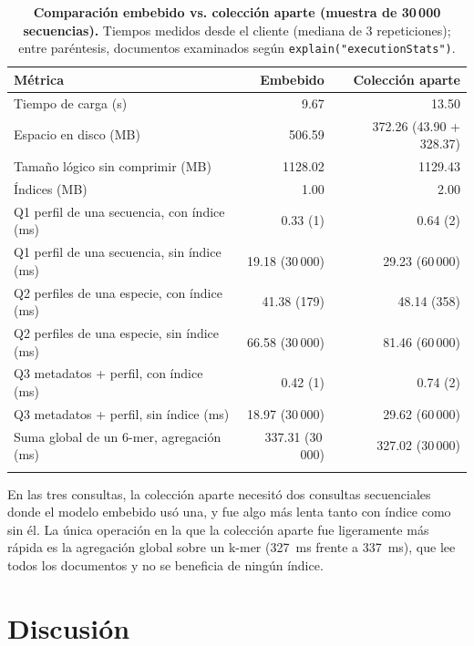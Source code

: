 \documentclass[pdflatex,sn-vancouver-num,lineno,referee]{sn-jnl}
\begin{document}
\begin{table}[!ht]
\caption{\textbf{Comparación embebido vs. colección aparte (muestra de 30\,000 secuencias).}
Tiempos medidos desde el cliente (mediana de 3 repeticiones); entre
paréntesis, documentos examinados según \texttt{explain("executionStats")}.}
\begin{tabular}{@{}lrr@{}}
\toprule
Métrica & Embebido & Colección aparte \\
\midrule
Tiempo de carga (s) & 9.67 & 13.50 \\
Espacio en disco (MB) & 506.59 & 372.26 (43.90 + 328.37) \\
Tamaño lógico sin comprimir (MB) & 1128.02 & 1129.43 \\
Índices (MB) & 1.00 & 2.00 \\
\midrule
Q1 perfil de una secuencia, con índice (ms) & 0.33 (1) & 0.64 (2) \\
Q1 perfil de una secuencia, sin índice (ms) & 19.18 (30\,000) & 29.23 (60\,000) \\
Q2 perfiles de una especie, con índice (ms) & 41.38 (179) & 48.14 (358) \\
Q2 perfiles de una especie, sin índice (ms) & 66.58 (30\,000) & 81.46 (60\,000) \\
Q3 metadatos + perfil, con índice (ms) & 0.42 (1) & 0.74 (2) \\
Q3 metadatos + perfil, sin índice (ms) & 18.97 (30\,000) & 29.62 (60\,000) \\
\midrule
Suma global de un 6-mer, agregación (ms) & 337.31 (30\,000) & 327.02 (30\,000) \\
\botrule
\end{tabular}
\label{tab:benchmark}
\end{table}

En las tres consultas, la colección aparte necesitó dos consultas
secuenciales donde el modelo embebido usó una, y fue algo más lenta tanto con
índice como sin él. La única operación en la que la colección aparte fue
ligeramente más rápida es la agregación global sobre un k-mer (327~ms frente
a 337~ms), que lee todos los documentos y no se beneficia de ningún índice.

\section{Discusión}\label{sec:discusion}
\end{document}
